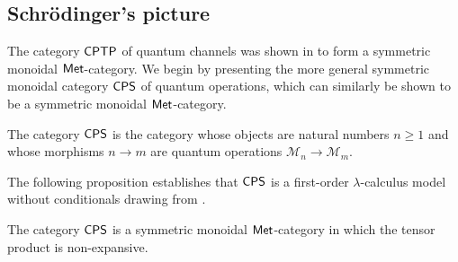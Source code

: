 \subsection{Schrödinger's picture} \label{subsec:shodinger}

The category $\mathsf{CPTP}$ of quantum channels was shown in \cite{dahlqvist2023syntactic} to form a symmetric monoidal $\mathsf{Met}$-category. We begin by presenting the more general symmetric monoidal category $\mathsf{CPS}$ of quantum operations, which can similarly be shown to be a symmetric monoidal $\mathsf{Met}$-category. 



\begin{definition} \label{ex:cat_cps}
The category $\mathsf{CPS}$ is the category whose objects are natural numbers $n \geq 1$ and whose morphisms $n \rightarrow m$ are quantum operations $\mathcal{M}_n \rightarrow \mathcal{M}_m$.
\end{definition}

The following proposition establishes that $\mathsf{CPS}$ is a first-order $\lambda$-calculus model without conditionals drawing from \cite{dahlqvist2023syntactic}.


\begin{proposition} \label{prop:Q_monoidal} 
  The category $\mathsf{CPS}$ is a symmetric monoidal $\mathsf{Met}$-category in which the tensor product is non-expansive.
\end{proposition}


